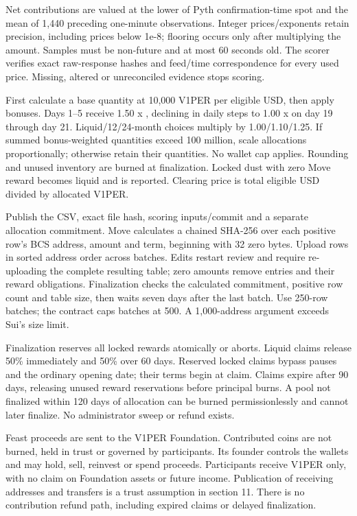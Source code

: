 \documentclass[11pt]{article}
\newcommand{\VOnePER}{\texorpdfstring{V\textcolor{brandone}{1}PER}{V1PER}}
\begin{document}
Net contributions are valued at the lower of Pyth confirmation-time spot and the mean of 1,440 preceding one-minute observations. Integer prices/exponents retain precision, including prices below 1e-8; flooring occurs only after multiplying the amount. Samples must be non-future and at most 60 seconds old. The scorer verifies exact raw-response hashes and feed/time correspondence for every used price. Missing, altered or unreconciled evidence stops scoring.

First calculate a base quantity at 10,000 \VOnePER{} per eligible USD, then apply bonuses. Days 1--5 receive 1.50 x , declining in daily steps to 1.00 x  on day 19 through day 21. Liquid/12/24-month choices multiply by 1.00/1.10/1.25. If summed bonus-weighted quantities exceed 100 million, scale allocations proportionally; otherwise retain their quantities. No wallet cap applies. Rounding and unused inventory are burned at finalization. Locked dust with zero Move reward becomes liquid and is reported. Clearing price is total eligible USD divided by allocated \VOnePER{}.

Publish the CSV, exact file hash, scoring inputs/commit and a separate allocation commitment. Move calculates a chained SHA-256 over each positive row's BCS address, amount and term, beginning with 32 zero bytes. Upload rows in sorted address order across batches. Edits restart review and require re-uploading the complete resulting table; zero amounts remove entries and their reward obligations. Finalization checks the calculated commitment, positive row count and table size, then waits seven days after the last batch. Use 250-row batches; the contract caps batches at 500. A 1,000-address argument exceeds Sui's size limit.

Finalization reserves all locked rewards atomically or aborts. Liquid claims release 50\% immediately and 50\% over 60 days. Reserved locked claims bypass pauses and the ordinary opening date; their terms begin at claim. Claims expire after 90 days, releasing unused reward reservations before principal burns. A pool not finalized within 120 days of allocation can be burned permissionlessly and cannot later finalize. No administrator sweep or refund exists.

Feast proceeds are sent to the \VOnePER{} Foundation. Contributed coins are not burned, held in trust or governed by participants. Its founder controls the wallets and may hold, sell, reinvest or spend proceeds. Participants receive \VOnePER{} only, with no claim on Foundation assets or future income. Publication of receiving addresses and transfers is a trust assumption in section 11. There is no contribution refund path, including expired claims or delayed finalization.
\end{document}
